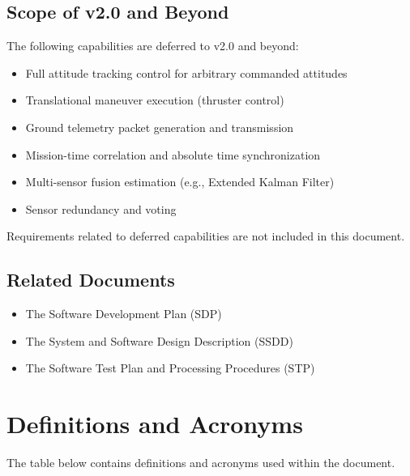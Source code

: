 \documentclass{article}
\begin{document}
        \subsection{Scope of v2.0 and Beyond}
            The following capabilities are deferred to v2.0 and beyond:
            \begin{itemize}
                \item Full attitude tracking control for arbitrary commanded 
                        attitudes
                \item Translational maneuver execution (thruster control)
                \item Ground telemetry packet generation and transmission
                \item Mission-time correlation and absolute time synchronization
                \item Multi-sensor fusion estimation 
                        (e.g., Extended Kalman Filter)
                \item Sensor redundancy and voting
            \end{itemize}
            Requirements related to deferred capabilities are not included in 
            this document.

        \subsection{Related Documents}
            \begin{itemize}[label={}]
                \item The Software Development Plan (SDP)
                \item The System and Software Design Description (SSDD)
                \item The Software Test Plan and Processing Procedures (STP)
            \end{itemize}

    \section{Definitions and Acronyms}\label{sec:definitions}

        The table below contains definitions and acronyms used within the 
        document.
\end{document}
